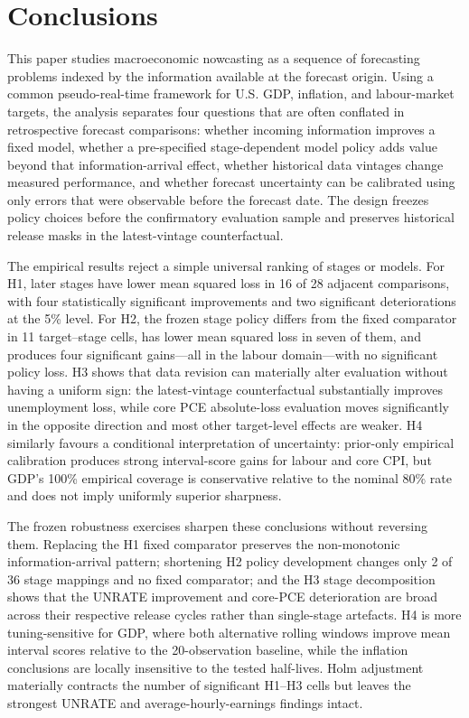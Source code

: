 \section{Conclusions}
\label{sec:conclusion}

This paper studies macroeconomic nowcasting as a sequence of forecasting
problems indexed by the information available at the forecast origin.  Using a
common pseudo-real-time framework for U.S. GDP, inflation, and labour-market
targets, the analysis separates four questions that are often conflated in
retrospective forecast comparisons: whether incoming information improves a
fixed model, whether a pre-specified stage-dependent model policy adds value
beyond that information-arrival effect, whether historical data vintages
change measured performance, and whether forecast uncertainty can be
calibrated using only errors that were observable before the forecast date.
The design freezes policy choices before the confirmatory evaluation sample and
preserves historical release masks in the latest-vintage counterfactual.

The empirical results reject a simple universal ranking of stages or models.
For H1, later stages have lower mean squared loss in 16 of 28 adjacent
comparisons, with four statistically significant improvements and two
significant deteriorations at the 5\% level.  For H2, the frozen stage policy
differs from the fixed comparator in 11 target--stage cells, has lower mean
squared loss in seven of them, and produces four significant gains---all in the
labour domain---with no significant policy loss.  H3 shows that data revision
can materially alter evaluation without having a uniform sign: the
latest-vintage counterfactual substantially improves unemployment loss, while
core PCE absolute-loss evaluation moves significantly in the opposite
direction and most other target-level effects are weaker.  H4 similarly
favours a conditional interpretation of uncertainty: prior-only empirical
calibration produces strong interval-score gains for labour and core CPI, but
GDP's 100\% empirical coverage is conservative relative to the nominal 80\%
rate and does not imply uniformly superior sharpness.

The frozen robustness exercises sharpen these conclusions without reversing
them. Replacing the H1 fixed comparator preserves the non-monotonic
information-arrival pattern; shortening H2 policy development changes only 2
of 36 stage mappings and no fixed comparator; and the H3 stage decomposition
shows that the UNRATE improvement and core-PCE deterioration are broad across
their respective release cycles rather than single-stage artefacts. H4 is
more tuning-sensitive for GDP, where both alternative rolling windows improve
mean interval scores relative to the 20-observation baseline, while the
inflation conclusions are locally insensitive to the tested half-lives. Holm
adjustment materially contracts the number of significant H1--H3 cells but
leaves the strongest UNRATE and average-hourly-earnings findings intact.

